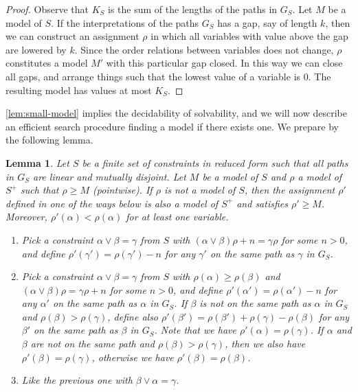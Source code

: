 \documentclass[11pt,a4paper]{article}
\newtheorem{lemma}{Lemma}[theorem]
\begin{document}
\begin{proof}
Observe that $K_{S}$ is the sum of the lengths of the paths in $G_S$.
Let $M$ be a model of $S$. If the interpretations of the paths $G_S$
has a gap, say of length $k$, then we can construct an assignment $\rho$
in which all variables with value above the gap are lowered by $k$.
Since the order relations between variables does not change, $\rho$
constitutes a model $M'$ with this particular gap closed.
In this way we can close all gaps, and arrange things such that
the lowest value of a variable is $0$. The resulting model
has values at most $K_{S}$.
\end{proof}

\cref{lem:small-model} implies the decidability of solvability,
and we will now describe an efficient search procedure finding a
model if there exists one. We prepare by the following lemma.

\begin{lemma}\label{lem:model-search}
Let  $S$ be a finite set of constraints in reduced form such that all paths 
in $G_S$ are linear and mutually disjoint.
Let $M$ be a model of $S$ and $\rho$ a model of $S^+$ such that $\rho\geq M$ (pointwise).
If $\rho$ is not a model of $S$, then the assignment $\rho'$ defined in 
one of the ways below is also a model of $S^+$ and satisfies $\rho'\geq M$.
Moreover, $\rho'(\alpha)<\rho(\alpha)$ for at least one variable.
\begin{enumerate}
\item Pick a constraint $\alpha\vee\beta = \gamma$ from $S$ with
$(\alpha\vee\beta)\rho +n = \gamma\rho$ for some $n>0$, and define 
$\rho'(\gamma') = \rho(\gamma')-n$ for any $\gamma'$ on the same path as $\gamma$ in $G_S$.
\item Pick a constraint $\alpha\vee\beta = \gamma$ from $S$ with $\rho(\alpha)\geq\rho(\beta)$
and $(\alpha\vee\beta)\rho = \gamma\rho +n$ for some $n>0$, and  define 
$\rho'(\alpha') = \rho(\alpha') -n$ for any $\alpha'$ on the same path as $\alpha$ in $G_S$.
If $\beta$ is not on the same path as $\alpha$ in $G_S$ and $\rho(\beta)>\rho(\gamma)$, define also
$\rho'(\beta') = \rho(\beta') + \rho(\gamma) - \rho(\beta)$ 
for any $\beta'$ on the same path as $\beta$ in $G_S$. Note that we have
$\rho'(\alpha) = \rho(\gamma)$. If $\alpha$ and $\beta$ are
not on the same path and $\rho(\beta)>\rho(\gamma)$, then we also have
$\rho'(\beta) = \rho(\gamma)$, otherwise we have $\rho'(\beta) = \rho(\beta)$.
\item Like the previous one with $\beta\vee\alpha = \gamma$.
\end{enumerate}
\end{lemma}
\end{document}
